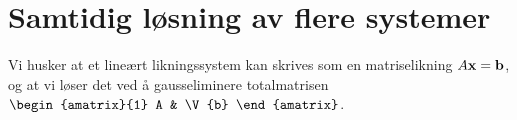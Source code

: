 








\section*{Samtidig løsning av flere systemer}

Vi husker at et lineært likningssystem kan skrives som en
matriselikning $A \mathbf{x} = \mathbf{b}$, og at vi løser det ved å
gausseliminere totalmatrisen
$\begin{amatrix}{1} A & \V{b} \end{amatrix}$.

